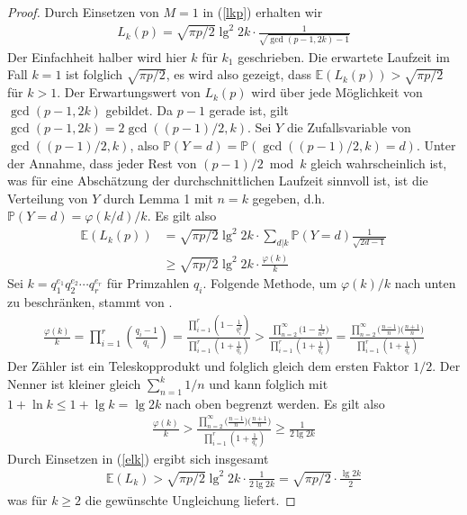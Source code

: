 \documentclass[a4paper, 10pt, ngerman]{article}
\newcommand{\E}{\mathbb{E}}
\renewcommand{\P}{\mathbb{P}}
\begin{document}
\begin{proof}
    Durch Einsetzen von $M = 1$ in (\ref{lkp}) erhalten wir
    \begin{align*}
        L_k(p) = \sqrt {\pi p / 2} \lg^2 2k \cdot \frac {1} {\sqrt{\gcd(p - 1, 2k) - 1}}
    \end{align*}
    Der Einfachheit halber wird hier $k$ für $k_1$ geschrieben. Die erwartete Laufzeit im Fall $k = 1$ ist folglich $\sqrt{\pi p/2}$, es wird also gezeigt, dass $\E(L_k(p)) > \sqrt{\pi p / 2}$ für $k > 1$. Der Erwartungswert von $L_k(p)$ wird über jede Möglichkeit von $\gcd(p - 1, 2k)$ gebildet. Da $p - 1$ gerade ist, gilt $\gcd(p - 1, 2k) = 2 \gcd((p - 1)/2, k)$. Sei $Y$ die Zufallsvariable von $\gcd((p - 1)/2, k)$, also $\mathbb{P}(Y = d) = \mathbb{P}(\gcd((p - 1)/2, k) = d)$. Unter der Annahme, dass jeder Rest von $(p - 1)/2 \bmod k$ gleich wahrscheinlich ist, was für eine Abschätzung der durchschnittlichen Laufzeit sinnvoll ist, ist die Verteilung von $Y$ durch Lemma 1 mit $n = k$ gegeben, d.h. $\mathbb{P}(Y = d) = \varphi(k/d)/k$. Es gilt also
    \begin{align}
        \E(L_k(p))
         & = \sqrt{\pi p / 2} \lg^2 2k \cdot \sum_{d | k} \P(Y = d) \frac 1 { \sqrt {2d - 1}} \nonumber \\
         & \ge \sqrt{\pi p / 2} \lg^2 2k \cdot \frac {\varphi(k)} k \label{elk}
    \end{align}
    Sei $k = q_1^{e_1} q_2^{e_2} \cdots q_r^{e_r}$ für Primzahlen $q_i$. Folgende Methode, um $\varphi(k)/k$ nach unten zu beschränken, stammt von \cite{phi}.
    \begin{align*}
        \frac {\varphi(k)} k = \prod_{i = 1}^r \left ( \frac {q_i - 1} {q_i} \right )
        = \frac{\prod_{i = 1}^r \left ( 1 - \frac 1 {q_i^2} \right )}{\prod_{i = 1}^r \left ( 1 + \frac 1 {q_i} \right )}
        > \frac {\prod_{n = 2}^\infty \Big ( 1 - \frac 1 {n^2} \Big )} {\prod_{i = 1}^r \left ( 1 + \frac 1 {q_i} \right )}
        = \frac {\prod_{n = 2}^\infty \Big ( \frac {n - 1} {n} \Big ) \Big ( \frac {n + 1} n \Big )} {\prod_{i = 1}^r \left ( 1 + \frac 1 {q_i} \right )}
    \end{align*}
    Der Zähler ist ein Teleskopprodukt und folglich gleich dem ersten Faktor $1/2$. Der Nenner ist kleiner gleich $\sum_{n = 1}^{k} 1/n$ und kann folglich mit $1 + \ln k \le 1 + \lg k = \lg 2k$ nach oben begrenzt werden. Es gilt also
    \begin{align*}
        \frac {\varphi(k)} k
        > \frac {\prod_{n = 2}^\infty \Big ( \frac {n - 1} {n} \Big ) \Big ( \frac {n + 1} n \Big )} {\prod_{i = 1}^r \left ( 1 + \frac 1 {q_i} \right )}
        \ge \frac {1}{2\lg 2k}
    \end{align*}
    Durch Einsetzen in (\ref{elk}) ergibt sich insgesamt
    \begin{align*}
        \E(L_k) > \sqrt{\pi p / 2} \lg^2 2k \cdot \frac {1} {2 \lg 2k} = \sqrt {\pi p / 2} \cdot \frac {\lg 2k} {2}
    \end{align*}
    was für $k \ge 2$ die gewünschte Ungleichung liefert.
\end{proof}
\end{document}
